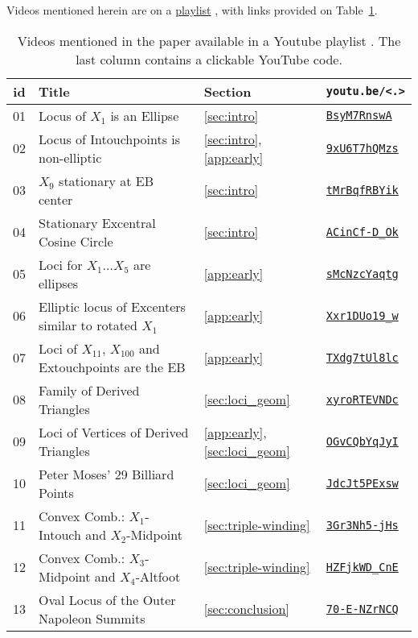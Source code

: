 Videos mentioned herein are on a \href{https://bit.ly/2REOigc}{playlist} \cite{dsr_playlist_2020}, with links provided on Table~\ref{tab:playlist}.

\begin{table}
\small
\begin{tabular}{|c|l|l|l|}
\hline
{id} & Title & Section & \texttt{youtu.be/<.>}\\
\hline
{01} &
{Locus of $X_1$ is an Ellipse} & \ref{sec:intro} & \href{https://youtu.be/BBsyM7RnswA}{\texttt{BsyM7RnswA}} \\
{02} &
{Locus of Intouchpoints is non-elliptic} & \ref{sec:intro}, \ref{app:early} & \href{https://youtu.be/9xU6T7hQMzs}{\texttt{9xU6T7hQMzs}}\\
{03} &
{$X_9$ stationary at EB center} & \ref{sec:intro} & \href{https://youtu.be/tMrBqfRBYik}{\texttt{tMrBqfRBYik}} \\
{04} &
{Stationary Excentral Cosine Circle}  &
\ref{sec:intro} & \href{https://youtu.be/ACinCf-D_Ok}{\texttt{ACinCf-D\_Ok}} \\
{05} &
{Loci for $X_1\ldots{X_5}$ are ellipses} &
\ref{app:early} & \href{https://youtu.be/sMcNzcYaqtg}{\texttt{sMcNzcYaqtg}} \\
{06} &
{Elliptic locus of Excenters similar to rotated $X_1$} &
\ref{app:early} & \href{https://youtu.be/Xxr1DUo19_w}{\texttt{Xxr1DUo19\_w}} \\
{07} &
{Loci of $X_{11}$, $X_{100}$ and Extouchpoints are the EB} &\ref{app:early} & \href{https://youtu.be/TXdg7tUl8lc}{\texttt{TXdg7tUl8lc}} \\
{08} &
{Family of Derived Triangles} &
\ref{sec:loci_geom} & \href{https://youtu.be/xyroRTEVNDc}{\texttt{xyroRTEVNDc}} \\
{09} &
{Loci of Vertices of Derived Triangles} &
 \ref{app:early},\ref{sec:loci_geom}& \href{https://youtu.be/OGvCQbYqJyI}{\texttt{OGvCQbYqJyI}} \\
{10} &
{Peter Moses' 29 Billiard Points} &
\ref{sec:loci_geom} & \href{https://youtu.be/JdcJt5PExsw}{\texttt{JdcJt5PExsw}}\\
{11} &
{Convex Comb.: $X_1$-Intouch and $X_2$-Midpoint} &
\ref{sec:triple-winding} & \href{https://youtu.be/3Gr3Nh5-jHs}{\texttt{3Gr3Nh5-jHs}}\\
{12} &
{Convex Comb.: $X_3$-Midpoint and $X_4$-Altfoot} &
\ref{sec:triple-winding} & \href{https://youtu.be/HZFjkWD_CnE}{\texttt{HZFjkWD\_CnE}}\\
{13} &
{Oval Locus of the Outer Napoleon Summits} &
\ref{sec:conclusion} & \href{https://youtu.be/70-E-NZrNCQ}{\texttt{70-E-NZrNCQ}} \\
\hline
\end{tabular}
\caption{Videos mentioned in the paper available in a Youtube playlist \cite{dsr_playlist_2020}. The last column contains a clickable YouTube code.}
\label{tab:playlist}
\end{table}

